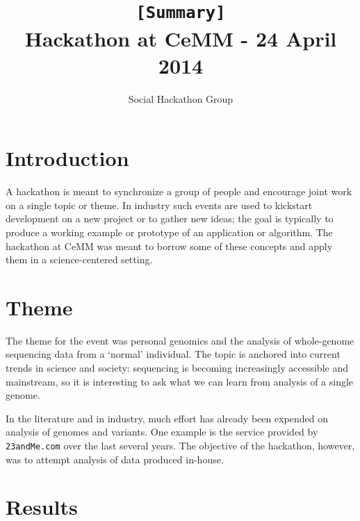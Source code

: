 \documentclass[a4paper,11pt]{TKnotes}
\begin{document}
\normalem

\title{{\tt [Summary]}\\ Hackathon at CeMM - 24 April 2014 }
\author{Social Hackathon Group}
\date{}
\maketitle

\tableofcontents

\clearpage
\section{Introduction}

A hackathon is meant to synchronize a group of people and encourage joint work on a single topic or theme. In industry such events are used to kickstart development on a new project or to gather new ideas; the goal is typically to produce a working example or prototype of an application or algorithm. The hackathon at CeMM was meant to borrow some of these concepts and apply them in a science-centered setting. 



\section{Theme}

The theme for the event was personal genomics and the analysis of whole-genome sequencing data from a `normal' individual. The topic is anchored into current trends in science and society: sequencing is becoming increasingly accessible and mainstream, so it is interesting to ask what we can learn from analysis of a single genome. 

In the literature and in industry, much effort has already been expended on analysis of genomes and variants. One example is the service provided by {\tt 23andMe.com} over the last several years. The objective of the hackathon, however, was to attempt analysis of data produced in-house.



\clearpage
\section{Results}
\end{document}
